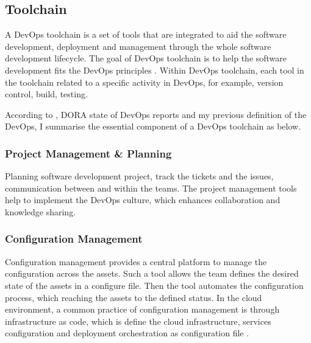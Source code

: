 \subsection{Toolchain}
A DevOps toolchain is a set of tools that are integrated to aid the software development, deployment and management through the whole software development lifecycle. The goal of DevOps toolchain is to help the software development fits the DevOps principles \cite{DevOpsto7:online}\cite{Toolchai10:online}\cite{WhatisaD20:online}. Within DevOps toolchain, each tool in the toolchain related to a specific activity in DevOps, for example, version control, build, testing.
\par
According to \cite{WhatisaD20:online}, DORA state of DevOps reports \cite{forsgrenaccelerate}\cite{velasquez2014state}\cite{forsgren20192019} and my previous definition of the DevOps, I summarise the essential component of a DevOps toolchain as below.
\subsubsection{Project Management \& Planning}
Planning software development project, track the tickets and the issues, communication between and within the teams. The project management tools help to implement the DevOps culture, which enhances collaboration and knowledge sharing.
\subsubsection{Configuration Management}
Configuration management provides a central platform to manage the configuration across the assets. Such a tool allows the team defines the desired state of the assets in a configure file. Then the tool automates the configuration process, which reaching the assets to the defined status. In the cloud environment, a common practice of configuration management is through infrastructure as code, which is define the cloud infrastructure, services configuration and deployment orchestration as configuration file \cite{7965401}.
